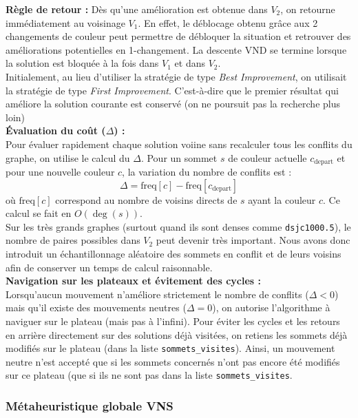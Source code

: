\documentclass{article}
\begin{document}
\textbf{Règle de retour :} Dès qu'une amélioration est obtenue dans $V_2$, on retourne immédiatement au voisinage $V_1$. En effet, le déblocage obtenu grâce aux 2 changements de couleur peut permettre de débloquer la situation et retrouver des améliorations potentielles en 1-changement. La descente VND se termine lorsque la solution est bloquée à la fois dans $V_1$ et dans $V_2$.\\

Initialement, au lieu d'utiliser la stratégie de type \textit{Best Improvement}, on utilisait la stratégie de type \textit{First Improvement}. C'est-à-dire que le premier résultat qui améliore la solution courante est conservé (on ne poursuit pas la recherche plus loin)\\

\textbf{Évaluation du coût ($\Delta$) :}\\
Pour évaluer rapidement chaque solution voiine sans recalculer tous les conflits du graphe, on utilise le calcul du $\Delta$. Pour un sommet $s$ de couleur actuelle $c_{\text{depart}}$ et pour une nouvelle couleur $c$, la variation du nombre de conflits est :
\[
\Delta = \text{freq}[c] - \text{freq}[c_{\text{depart}}]
\]
où $\text{freq}[c]$ correspond au nombre de voisins directs de $s$ ayant la couleur $c$. Ce calcul se fait en $O(\deg(s))$.\\

Sur les très grands graphes (surtout quand ils sont denses comme \texttt{dsjc1000.5}), le nombre de paires possibles dans $V_2$ peut devenir très important. Nous avons donc introduit un échantillonnage aléatoire des sommets en conflit et de leurs voisins afin de conserver un temps de calcul raisonnable.\\

\textbf{Navigation sur les plateaux et évitement des cycles :}\\
Lorsqu'aucun mouvement n'améliore strictement le nombre de conflits ($\Delta < 0$) mais qu'il existe des mouvements neutres ($\Delta = 0$), on autorise l'algorithme à naviguer sur le plateau (mais pas à l'infini). Pour éviter les cycles et les retours en arrière directement sur des solutions déjà visitées, on retiens les sommets déjà modifiés sur le plateau (dans la liste \texttt{sommets\_visites}). Ainsi, un mouvement neutre n'est accepté que si les sommets concernés n'ont pas encore été modifiés sur ce plateau (que si ils ne sont pas dans la liste \texttt{sommets\_visites}.

\subsubsection{Métaheuristique globale VNS}
\end{document}

